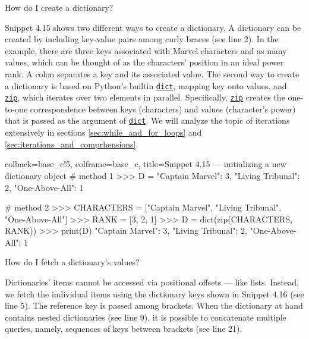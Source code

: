 \documentclass[a4paper,11pt]{book}
\newcommand{\question}[1]{%
    \begin{tcolorbox}[colback=comp_c!10,colframe=comp_c,sidebyside align=top,width=\linewidth,before skip=1ex]
        #1
    \end{tcolorbox}
    \switchcolumn%
}
\newcommand{\note}[1]{%
    \begin{tcolorbox}[colback=white!0,colframe=white!10,width=\linewidth,before skip=1ex]
        #1
    \end{tcolorbox}
}
\begin{document}
\begin{paracol}{2}
	\question{\raggedright How do I create a dictionary?}
	\note{Snippet 4.15 shows two different ways to create a dictionary. A dictionary can be created by including key-value pairs among curly braces (see line 2). In the example, there are three keys associated with Marvel characters and as many values, which can be thought of as the characters' position in an ideal power rank. A colon separates a key and its associated value. The second way to create a dictionary is based on Python's builtin \href{https://docs.python.org/3/library/stdtypes.html\#dict}{\texttt{dict}}, mapping key onto values, and \href{https://docs.python.org/3/library/functions.html\#zip}{\texttt{zip}}, which iterates over two elements in parallel. Specifically, \href{https://docs.python.org/3/library/functions.html\#zip}{\texttt{zip}} creates the one-to-one correspondence between keys (characters) and values (character's power) that is passed as the argument of \href{https://docs.python.org/3/library/stdtypes.html\#dict}{\texttt{dict}}. We will analyze the topic of iterations extensively in sections \ref{sec:while_and_for_loops} and \ref{sec:iterations_and_comprhensions}.}
\end{paracol}

\begin{pythoncode}[linenos=true,]{colback=base_c!5, colframe=base_c, title=\sffamily Snippet 4.15 --- initializing a new dictionary object}
# method 1 
>>> D = {"Captain Marvel": 3, "Living Tribunal": 2, "One-Above-All": 1}

# method 2
>>> CHARACTERS = ["Captain Marvel", "Living Tribunal", "One-Above-All"]
>>> RANK = [3, 2, 1]
>>> D = dict(zip(CHARACTERS, RANK)) 
>>> print(D)
{"Captain Marvel": 3, "Living Tribunal": 2, "One-Above-All": 1}
\end{pythoncode}

\begin{paracol}{2}
	\question{\raggedright How do I fetch a dictionary's values?}
	\note{Dictionaries' items cannot be accessed via positional offsets --- like lists. Instead, we fetch the individual items using the dictionary keys shown in Snippet 4.16 (see line 5). The reference key is passed among brackets. When the dictionary at hand contains nested dictionaries (see line 9), it is possible to concatenate multiple queries, namely, sequences of keys between brackets (see line 21).}
\end{paracol}
\clearpage
\end{document}
